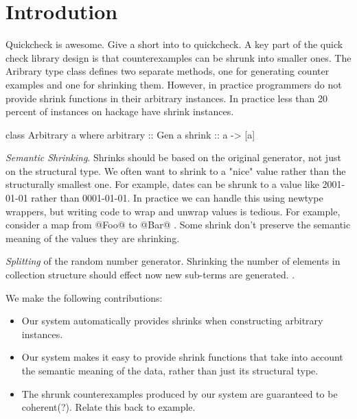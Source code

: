 \section{Introdution}

Quickcheck\cite{claessen:quickcheck} is awesome. Give a short into to quickcheck. A key part of the quick check library design is that counterexamples can be shrunk into smaller ones. The Aribrary type class defines two separate methods, one for generating counter examples and one for shrinking them. However, in practice programmers do not provide shrink functions in their arbitrary instances. In practice less than 20 percent of instances on hackage have shrink instances. 

\begin{code}
  class Arbitrary a where
   arbitrary :: Gen a
   shrink    :: a -> [a]
\end{code}

\emph{Semantic Shrinking}. Shrinks should be based on the original generator, not just on the structural type. We often want to shrink to a "nice" value rather than the structurally smallest one. For example, dates can be shrunk to a value like 2001-01-01 rather than 0001-01-01. In practice we can handle this using newtype wrappers, but writing code to wrap and unwrap values is tedious. For example, consider a map from @Foo@ to @Bar@ . Some shrink don't preserve the semantic meaning of the values they are shrinking.

\emph{Splitting} of the random number generator. Shrinking the number of elements in collection structure should effect now new sub-terms are generated. .


We make the following contributions:
\begin{itemize}
\item Our system automatically provides shrinks when constructing arbitrary instances.

\item Our system makes it easy to provide shrink functions that take into account the semantic meaning of the data, rather than just its structural type.

\item The shrunk counterexamples produced by our system are guaranteed to be coherent(?). Relate this back to example.
\end{itemize}
